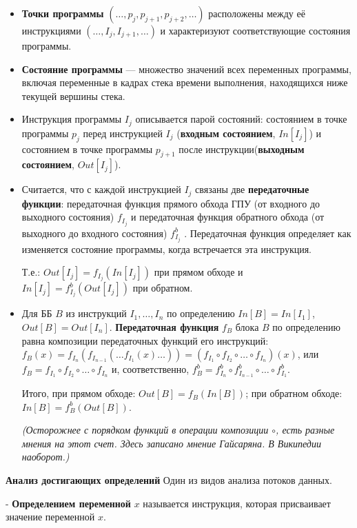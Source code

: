 \begin{itemize}
    \item \textbf{Точки программы} $(\dots, p_j , p_{j+1} , p_{j+2} , \dots)$ расположены между её инструкциями $(\dots, I_j , I_{j+1} , \dots)$ и характеризуют соответствующие состояния программы.

    \item \textbf{Состояние программы} --- множество значений всех переменных программы, включая переменные в кадрах стека времени выполнения, находящихся ниже текущей вершины стека.

    \item Инструкция программы $I_j$ описывается парой состояний: состоянием в точке программы $p_j$ перед инструкцией $I_j$ (\textbf{входным состоянием}, $In[I_j]$) и состоянием в точке программы $p_{j+1}$ после инструкции(\textbf{выходным состоянием}, $Out[I_j]$).

    \item Считается, что с каждой инструкцией $I_j$ связаны две \textbf{передаточные функции}: передаточная функция прямого обхода ГПУ (от входного до выходного состояния) $f_{I_j}$ и передаточная функция обратного обхода (от выходного до входного состояния) $f^b_{I_j}$ . Передаточная функция определяет как изменяется состояние программы, когда встречается эта инструкция.

    Т.е.: $Out[I_j] = f_{I_j}(In[I_j])$ при прямом обходе и $In[I_j] = f^b_{I_j}(Out[I_j])$ при обратном.
    \item Для ББ $B$ из инструкций $I_1, \dots, I_n$ по определению $In[B] = In[I_1]$, $Out[B] = Out[I_n]$.
    \textbf{Передаточная функция} $f_B$ блока $B$ по определению равна композиции передаточных функций его инструкций: $f_B(x) = f_{I_n}(f_{I_{n-1}}(\dots f_{I_1}(x)\dots)) = (f_{I_1} \circ f_{I_2} \circ \dots \circ f_{I_n})(x)$, или $f_B = f_{I_1} \circ f_{I_2} \circ \dots \circ f_{I_n}$ и, соответственно, $f^b_B = f^b_{I_n} \circ f^b_{I_{n-1}} \circ \dots \circ f^b_{I_1}$.

    Итого, при прямом обходе: $Out[B] = f_B(In[B])$; при обратном обходе: $In[B] = f^b_B(Out[B])$.

    \textit{(Осторожнее с порядком функций в операции композиции $\circ$, есть разные мнения на этот счет. Здесь записано мнение Гайсаряна. В Википедии наоборот.)}
\end{itemize}

\textbf{Анализ достигающих определений}
    Один из видов анализа потоков данных.

- \textbf{Определением переменной} $x$ называется инструкция, которая присваивает значение переменной $x$.

